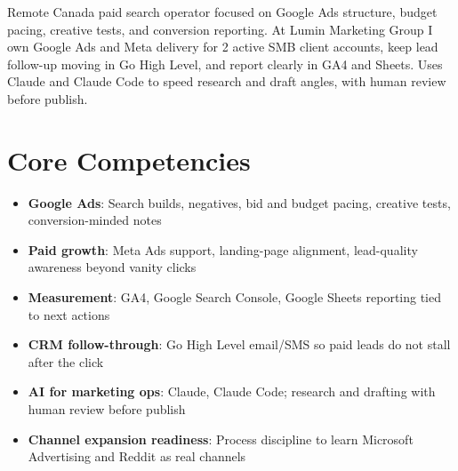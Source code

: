 \documentclass[11pt,a4paper,sans]{moderncv}
\begin{document}
\makecvtitle

\vspace{6pt}
\small{Remote Canada paid search operator focused on Google Ads structure, budget pacing, creative tests, and conversion reporting. At Lumin Marketing Group I own Google Ads and Meta delivery for 2 active SMB client accounts, keep lead follow-up moving in Go High Level, and report clearly in GA4 and Sheets. Uses Claude and Claude Code to speed research and draft angles, with human review before publish.}

\section{Core Competencies}
\vspace{1pt}
\begin{itemize}
\item \textbf{Google Ads}: Search builds, negatives, bid and budget pacing, creative tests, conversion-minded notes
\item \textbf{Paid growth}: Meta Ads support, landing-page alignment, lead-quality awareness beyond vanity clicks
\item \textbf{Measurement}: GA4, Google Search Console, Google Sheets reporting tied to next actions
\item \textbf{CRM follow-through}: Go High Level email/SMS so paid leads do not stall after the click
\item \textbf{AI for marketing ops}: Claude, Claude Code; research and drafting with human review before publish
\item \textbf{Channel expansion readiness}: Process discipline to learn Microsoft Advertising and Reddit as real channels
\end{itemize}
\end{document}
